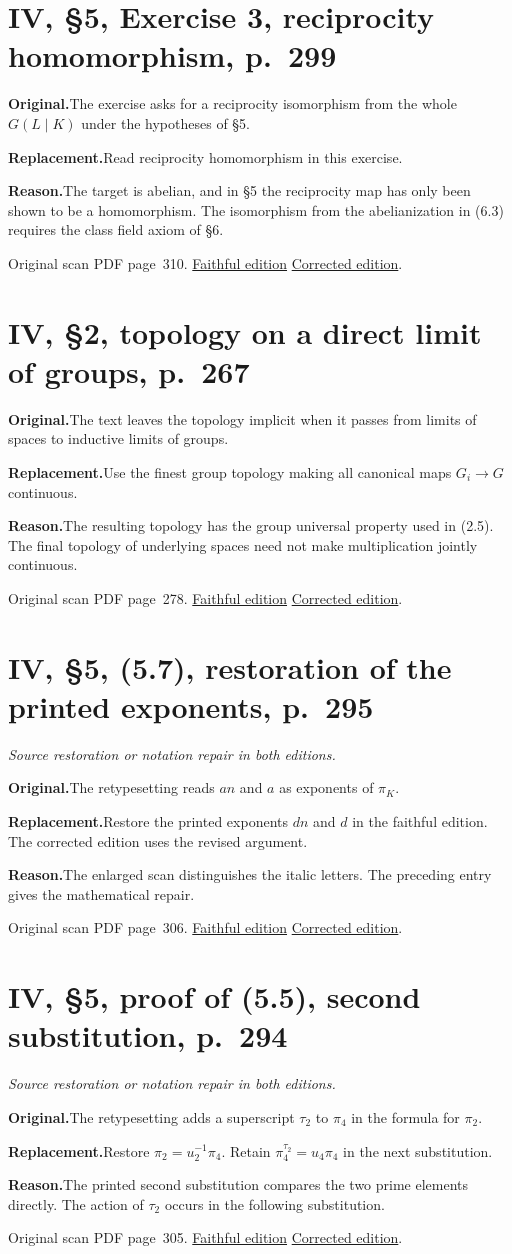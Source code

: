 \documentclass[11pt,a4paper]{article}
\newcommand{\original}{\par\smallskip\noindent\textbf{Original.}\enspace}
\newcommand{\replacement}{\par\smallskip\noindent\textbf{Replacement.}\enspace}
\newcommand{\reason}{\par\smallskip\noindent\textbf{Reason.}\enspace}
\newcommand{\editionlink}[3]{\href{#1\#errata.#2}{#3}}
\newcommand{\location}[2]{%
  \par\smallskip\noindent Original scan PDF page~#2.\enspace
  \editionlink{Neukirch_Faithful.pdf}{#1}{Faithful edition}
  \quad\editionlink{Neukirch_Corrected.pdf}{#1}{Corrected edition}.}
\begin{document}
\setcounter{section}{105}
\section{IV, \S5, Exercise 3, reciprocity homomorphism, p.~299}\label{errata:item:106}

\original The exercise asks for a reciprocity isomorphism from the whole $G(L\mid K)$ under the hypotheses of \S5.
\replacement Read reciprocity homomorphism in this exercise.
\reason The target is abelian, and in \S5 the reciprocity map has only been shown to be a homomorphism. The isomorphism from the abelianization in (6.3) requires the class field axiom of \S6.
\location{106}{310}

\setcounter{section}{106}
\section{IV, \S2, topology on a direct limit of groups, p.~267}\label{errata:item:107}

\original The text leaves the topology implicit when it passes from limits of spaces to inductive limits of groups.
\replacement Use the finest group topology making all canonical maps $G_i\to G$ continuous.
\reason The resulting topology has the group universal property used in (2.5). The final topology of underlying spaces need not make multiplication jointly continuous.
\location{107}{278}

\setcounter{section}{107}
\section{IV, \S5, (5.7), restoration of the printed exponents, p.~295}\label{errata:item:108}
\noindent\emph{Source restoration or notation repair in both editions.}\par
\original The retypesetting reads $an$ and $a$ as exponents of $\pi_K$.
\replacement Restore the printed exponents $dn$ and $d$ in the faithful edition. The corrected edition uses the revised argument.
\reason The enlarged scan distinguishes the italic letters. The preceding entry gives the mathematical repair.
\location{108}{306}

\setcounter{section}{108}
\section{IV, \S5, proof of (5.5), second substitution, p.~294}\label{errata:item:109}
\noindent\emph{Source restoration or notation repair in both editions.}\par
\original The retypesetting adds a superscript $\tau_2$ to $\pi_4$ in the formula for $\pi_2$.
\replacement Restore $\pi_2=u_2^{-1}\pi_4$. Retain $\pi_4^{\tau_2}=u_4\pi_4$ in the next substitution.
\reason The printed second substitution compares the two prime elements directly. The action of $\tau_2$ occurs in the following substitution.
\location{109}{305}
\end{document}
